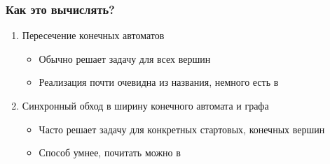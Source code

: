 \documentclass[
    aspectratio=169,
]{beamer}
\begin{document}
\begin{frame}
    \frametitle{Как это вычислять?}

    \begin{enumerate}
        \item Пересечение конечных автоматов
              \begin{itemize}
                  \item Обычно решает задачу для всех вершин
                  \item Реализация почти очевидна из названия, немного есть в \cite{shemetova_one_2021}
              \end{itemize}
        \item Синхронный обход в ширину конечного автомата и графа
              \begin{itemize}
                  \item Часто решает задачу для конкретных стартовых, конечных вершин
                  \item Способ умнее, почитать можно в \cite{elekes_graphblas_2020}
              \end{itemize}
    \end{enumerate}

\end{frame}
\end{document}
